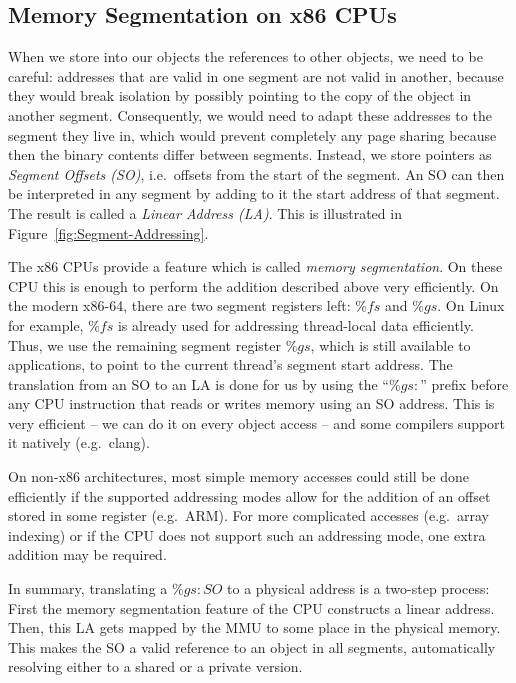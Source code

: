 \documentclass{sigplanconf}
\begin{document}
\subsection{Memory Segmentation on x86 CPUs}

When we store into our objects the references to other objects, we
need to be careful: addresses that are valid in one segment are not
valid in another, because they would break isolation by possibly pointing to
the copy of the object in another segment.  Consequently, we would
need to adapt these addresses to the segment they live in, which would
prevent completely any page sharing because then the binary contents
differ between segments.  Instead, we store pointers as
\emph{Segment Offsets (SO)}, i.e.\ offsets from the start of the
segment.  An SO can then be interpreted in any segment by adding to
it the start address of that segment. The
result is called a \emph{Linear Address (LA)}. This is illustrated in
Figure~\ref{fig:Segment-Addressing}.

The x86 CPUs provide a feature which is called \emph{memory
  segmentation}.  On these CPU this is enough to perform the addition
described above very efficiently. On the modern x86-64, there are two
segment registers left: $\%fs$ and $\%gs$.  On Linux for example,
$\%fs$ is already used for addressing thread-local data
efficiently. Thus, we use the remaining segment register $\%gs$, which is
still available to applications, to point to the current thread's segment
start address.  The translation from an SO to an LA is done for us by
using the ``$\%gs\colon$'' prefix before any CPU instruction that
reads or writes memory using an SO address.  This is very efficient
-- we can do it on every object access -- and some compilers support it
natively (e.g.\ clang).

On non-x86 architectures, most simple memory accesses could still be
done efficiently if the supported addressing modes allow for the
addition of an offset stored in some register (e.g.\ ARM). For more
complicated accesses (e.g.\ array indexing) or if the CPU does not
support such an addressing mode, one extra addition may be required.

In summary, translating a $\%gs:SO$ to a physical address is a
two-step process: First the memory segmentation feature of the CPU
constructs a linear address. Then, this LA gets mapped by the MMU to
some place in the physical memory. This makes the SO a valid reference
to an object in all segments, automatically resolving either to a
shared or a private version.
\end{document}

